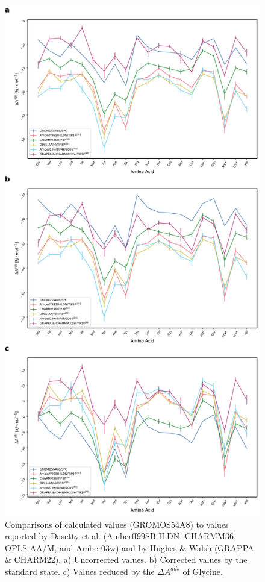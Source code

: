 \documentclass[9pt]{article}
\begin{document}
\begin{figure}
    \centering
    \includegraphics[width=.6\textwidth]{figures/FigS10.pdf}
    \caption{Comparisons of calculated values (GROMOS54A8) to values reported by Dasetty et al. (Amberff99SB-ILDN, CHARMM36, OPLS-AA/M, and Amber03w) and by Hughes \& Walsh (GRAPPA \& CHARM22). a) Uncorrected values. b) Corrected values by the standard state. c) Values reduced by the $\Delta A^{ads}$ of Glycine.}
    \label{fig:Comparisons}
\end{figure}
\end{document}
